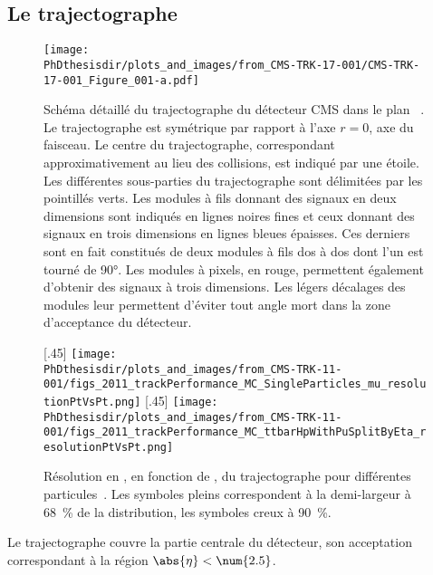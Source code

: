 \subsection{Le trajectographe}\label{chapter-LHC-section-CMS-subsec-tracker}
\begin{figure}[p]
\centering
\texttt{[image: \\PhDthesisdir/plots\_and\_images/from\_CMS-TRK-17-001/CMS-TRK-17-001\_Figure\_001-a.pdf]}
\caption[Schéma détaillé du trajectographe du détecteur CMS.]{Schéma détaillé du trajectographe du détecteur CMS dans le plan ~\cite{CMS-TRK-11-001,CMS-TRK-17-001}. Le trajectographe est symétrique par rapport à l'axe $r=0$, axe du faisceau. Le centre du trajectographe, correspondant approximativement au lieu des collisions, est indiqué par une étoile. Les différentes sous-parties du trajectographe sont délimitées par les pointillés verts. Les modules à fils donnant des signaux en deux dimensions sont indiqués en lignes noires fines et ceux donnant des signaux en trois dimensions en lignes bleues épaisses. Ces derniers sont en fait constitués de deux modules à fils dos à dos dont l'un est tourné de \ang{90}. Les modules à pixels, en rouge, permettent également d'obtenir des signaux à trois dimensions. Les légers décalages des modules leur permettent d'éviter tout angle mort dans la zone d'acceptance du détecteur.}
\label{fig-CMS-trk_detailed_scheme}
\end{figure}
\begin{figure}[p]
\centering
{}[.45\textwidth]
{\texttt{[image: \\PhDthesisdir/plots\_and\_images/from\_CMS-TRK-11-001/figs\_2011\_trackPerformance\_MC\_SingleParticles\_mu\_resolutionPtVsPt.png]}}
\hfill
{}[.45\textwidth]
{\texttt{[image: \\PhDthesisdir/plots\_and\_images/from\_CMS-TRK-11-001/figs\_2011\_trackPerformance\_MC\_ttbarHpWithPuSplitByEta\_resolutionPtVsPt.png]}}
\caption[Résolution en \pT\ du trajectographe.]{Résolution en \pT, en fonction de \pT, du trajectographe pour différentes particules~\cite{CMS-TRK-11-001}. Les symboles pleins correspondent à la demi-largeur à \SI{68}{\%} de la distribution, les symboles creux à \SI{90}{\%}.}
\label{fig-chapter-LHC-section-CMS-subsec-tracker-pT-resolution}
\end{figure}
Le trajectographe couvre la partie centrale du détecteur, son acceptation correspondant à la région $\abs{\eta} < \num{2.5}$.
